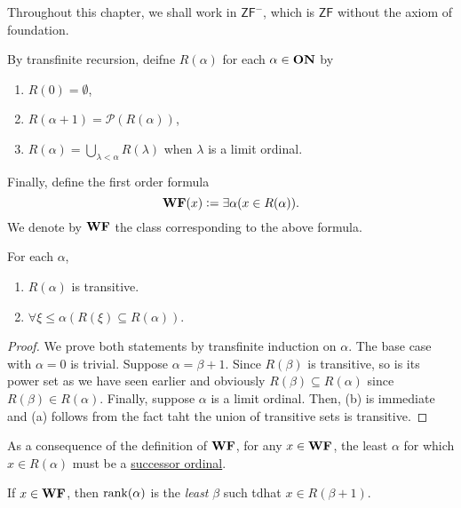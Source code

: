 Throughout this chapter, we shall work in $\mathsf{ZF}^-$, which is $\mathsf{ZF}$ without the axiom of foundation.
\begin{definition}
    By transfinite recursion, deifne $R(\alpha)$ for each $\alpha\in\mathbf{ON}$ by 
    \begin{enumerate}[label=(\alph*)]
        \item $R(0) = \emptyset$, 
        \item $R(\alpha + 1) = \mathscr P(R(\alpha))$, 
        \item $R(\alpha) = \bigcup_{\lambda < \alpha} R(\lambda)$ when $\lambda$ is a limit ordinal.
    \end{enumerate}
    Finally, define the first order formula 
    \begin{equation*}
        \mathbf{WF}(x) := \exists\alpha(x\in R(\alpha)).
    \end{equation*}
    We denote by $\mathbf{WF}$ the class corresponding to the above formula.
\end{definition}

\begin{lemma}
    For each $\alpha$, 
    \begin{enumerate}
        \item $R(\alpha)$ is transitive. 
        \item $\forall\xi\le\alpha(R(\xi)\subseteq R(\alpha))$.
    \end{enumerate}
\end{lemma}
\begin{proof}
    We prove both statements by transfinite induction on $\alpha$. The base case with $\alpha = 0$ is trivial. Suppose $\alpha = \beta + 1$. Since $R(\beta)$ is transitive, so is its power set as we have seen earlier and obviously $R(\beta)\subseteq R(\alpha)$ since $R(\beta)\in R(\alpha)$. Finally, suppose $\alpha$ is a limit ordinal. Then, (b) is immediate and (a) follows from the fact taht the union of transitive sets is transitive.
\end{proof}

\begin{remark}
    As a consequence of the definition of $\mathbf{WF}$, for any $x\in\mathbf{WF}$, the least $\alpha$ for which $x\in R(\alpha)$ must be a \ul{successor ordinal}.
\end{remark}

\begin{definition}
    If $x\in\mathbf{WF}$, then $\operatorname{rank}(\alpha)$ is the \emph{least} $\beta$ such tdhat $x\in R(\beta + 1)$.
\end{definition}

